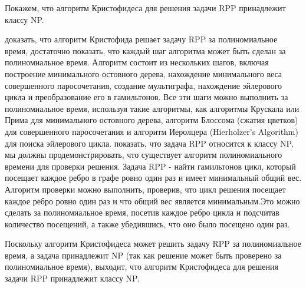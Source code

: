 Покажем, что алгоритм Кристофидеса для решения задачи RPP принадлежит классу NP.
\begin{enumerate}
     доказать, что алгоритм Кристофида решает задачу RPP за полиномиальное время, достаточно показать, что каждый шаг алгоритма может быть сделан за полиномиальное время. Алгоритм состоит из нескольких шагов, включая построение минимального остовного дерева, нахождение минимального веса совершенного паросочетания, создание мультиграфа, нахождение эйлерового цикла и преобразование его в гамильтонов. Все эти шаги можно выполнить за полиномиальное время, используя такие алгоритмы, как алгоритмы Крускала или Прима для минимального остовного дерева, алгоритм Блоссома (сжатия цветков) для совершенного паросочетания и алгоритм Иеролцера (Hierholzer’s Algorithm) для поиска эйлерового цикла.
     показать, что задача RPP относится к классу NP, мы должны продемонстрировать, что существует алгоритм полиномиального времени для проверки решения. Задача RPP - найти гамильтонов цикл, который посещает каждое ребро в графе ровно один раз и имеет минимальный общий вес. Алгоритм проверки можно выполнить, проверив, что цикл решения посещает каждое ребро ровно один раз и что общий вес является минимальным.Это можно сделать за полиномиальное время, посетив каждое ребро цикла и подсчитав количество посещений, а также убедившись, что оно было посещено один раз.
\end{enumerate}
Поскольку алгоритм Кристофидеса может решить задачу RPP за полиномиальное время, а задача принадлежит NP (так как решение может быть проверено за полиномиальное время), выходит, что алгоритм Кристофидеса для решения задачи RPP принадлежит классу NP.